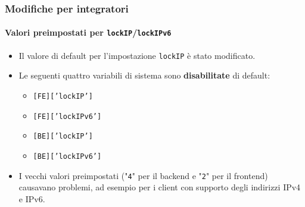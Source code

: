 \begin{frame}[fragile]
	\frametitle{Modifiche per integratori}
	\framesubtitle{Valori preimpostati per \texttt{lockIP}/\texttt{lockIPv6}}

	\lstset{basicstyle=\smaller\ttfamily}

	\begin{itemize}
		\item Il valore di default per l'impostazione \texttt{lockIP} è stato modificato.
		\item Le seguenti quattro variabili di sistema sono \textbf{disabilitate} di default:

			\begin{itemize}
				\item \texttt{[FE]['lockIP']}
				\item \texttt{[FE]['lockIPv6']}
				\item \texttt{[BE]['lockIP']}
				\item \texttt{[BE]['lockIPv6']}
			\end{itemize}

		\item I vecchi valori preimpostati ("\texttt{4}" per il backend e "\texttt{2}" per il frontend)
			causavano problemi, ad esempio per i client con supporto degli indirizzi IPv4 e IPv6.

	\end{itemize}

\end{frame}


